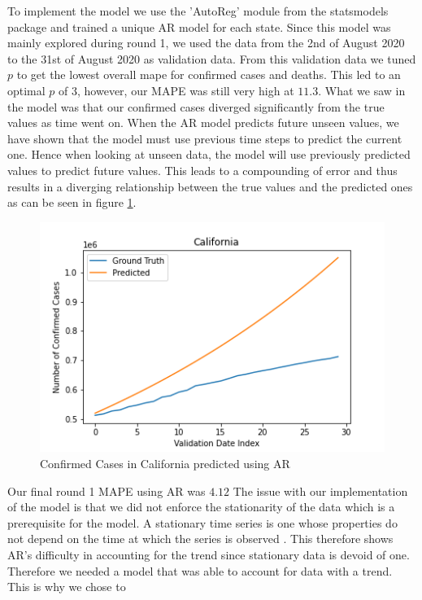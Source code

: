 \documentclass[sigconf,nonacm]{acmart}
\begin{document}
To implement the model we use the 'AutoReg' module from the statsmodels package \cite{statsmodels}
and trained a unique AR model for each state. Since this model
was mainly explored during round 1, we used the data from the 2nd of August 2020 to the 31st of August 2020
as validation data. From this validation data we tuned $p$ to get the lowest overall mape for confirmed cases and deaths.
This led to an optimal $p$ of 3, however, our MAPE was still very high at $11.3$. What we saw in the model was that our
confirmed cases diverged significantly from the true values as time went on. When the AR model predicts future unseen values,
we have shown that the model must use previous time steps to predict the current one. Hence when looking at unseen data, 
the model will use previously predicted values to predict future values. This leads to a compounding of error and thus 
results in a diverging relationship between the true values and the predicted ones as can be seen in figure \ref{fig:AR}.
\begin{figure}
  \includegraphics[width=\linewidth]{./figures/Section2_AR_Cali_Conf.png}
  \caption{Confirmed Cases in California predicted using AR}
  \label{fig:AR}
\end{figure} 
Our final round 1 MAPE using AR was $4.12$
The issue with our implementation of the model is that we did not enforce the stationarity of the data which 
is a prerequisite for the model. A stationary time series is one whose properties do not depend on the time at 
which the series is observed \cite{forecasting}.
This therefore shows AR's difficulty in accounting for the trend since stationary
data is devoid of one. Therefore we needed a model that was able to account for data with a trend. This is why we chose to 
\end{document}
